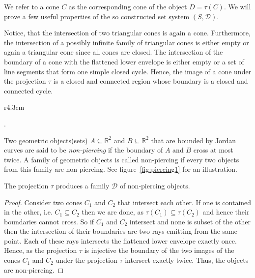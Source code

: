 \documentclass{stacs_proc}
\newcommand{\setR}{\mathbb{R}}
\newcommand{\D}{\mathcal{D}}
\begin{document}
We refer to a cone $C$ as the corresponding cone of the object
$D=\tau(C)$. We will prove a few useful properties of the so constructed
set system $(S, \D)$. 

Notice, that the intersection of two triangular cones is again a
cone. Furthermore, the intersection of a possibly infinite family of
triangular cones is either empty or again a triangular cone since all
cones are closed. The intersection of the boundary of a cone with the
flattened lower envelope is either empty or a set of line segments
that form one simple closed cycle. Hence, the image of a cone under
the projection $\tau$ is a closed and connected region whose boundary is
a closed and connected cycle. 
  
\vspace{-3ex}
\begin{wrapfigure}[11]{r}{4.3cm}
  \begin{center}
    \caption{A set of non-piercing objects}
    \label{fig:piercing1}
  \end{center}
\end{wrapfigure}
.
\begin{definition}
Two geometric objects(sets) $A\subseteq \setR^2$ and $B\subseteq \setR^2$ that are bounded
  by Jordan curves are said to be 
  \emph{non-piercing} 
  if 
the boundary of $A$ and $B$ cross at most twice.
  A family of geometric objects is called non-piercing if every
  two objects from this family are non-piercing. See
  figure~\ref{fig:piercing1} for an illustration. 
\end{definition}




 
\begin{lemma}
  \label{lem:piercing}
  The projection $\tau$ produces a family $\D$ of non-piercing objects.
\end{lemma}

\begin{proof}
  Consider two cones $C_1$ and $C_2$ that intersect each other. If one
  is contained in the other, i.e. $C_1\subseteq C_2$ then we are done, as
  $\tau(C_1)\subseteq \tau(C_2)$ and hence their boundaries cannot cross. So if
  $C_1$ and $C_2$ intersect and none is subset of the other then the
  intersection of their boundaries are two rays emitting from the same
  point. Each of these rays intersects the flattened lower envelope
  exactly once. Hence, as the projection $\tau$ is injective the boundary
  of the two images of the cones $C_1$ and $C_2$ under the projection
  $\tau$ intersect exactly twice. Thus, the objects are non-piercing.   
\end{proof}
\end{document}
